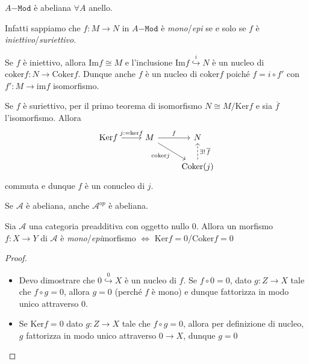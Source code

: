 \begin{example}{}
    \(A\mathtt{-Mod}\) è abeliana \(\forall A\) anello.

    Infatti sappiamo che \(f : M \to N\) in \(A\mathtt{-Mod}\) è \emph{mono}/\emph{epi} se
    e solo se \(f\) è \emph{iniettivo}/\emph{suriettivo}.

    Se \(f\) è iniettivo, allora \(\mathrm{Im}f \cong M\) e l'inclusione \(\mathrm{Im}f \overset{i}{\hookrightarrow } N\) è un nucleo di \(\mathrm{coker}f : N \to \mathrm{Coker}f\). 
    Dunque anche \(f\) è un nucleo di \(\mathrm{coker}f\) poiché \(f = i \circ f'\) con \(f' : M \to \mathrm{im}f\) isomorfismo.

    Se \(f\) è suriettivo, per il primo teorema di isomorfismo \(N \cong M / \mathrm{Ker}f\) e sia 
    \(\overline{f}\) l'isomorfismo. Allora
\[\begin{tikzcd}
	{\mathrm{Ker}f} & M & N \\
	&& {\mathrm{Coker}(j)}
	\arrow["{j:=\mathrm{ker}f}", from=1-1, to=1-2]
	\arrow["f", from=1-2, to=1-3]
	\arrow["{\mathrm{coker}j}"', from=1-2, to=2-3]
	\arrow["{\exists!\,\overline{f}}"', dashed, from=2-3, to=1-3]
\end{tikzcd}\]
    commuta e dunque \(f\) è un conucleo di \(j\).
\end{example}

\begin{remark}{}
    Se \(\mathcal{A}\) è abeliana, anche \(\mathcal{A}^{op}\) è abeliana.
\end{remark}

\begin{proposition}{}
    Sia \(\mathcal{A}\) una categoria preadditiva con oggetto nullo \(0\).
    Allora un morfismo \(f : X \to Y\) di \(\mathcal{A}\) è
    \emph{mono}/\emph{epi}morfismo \(\iff\) \emph{\(\mathrm{Ker}f =
    0\)}/\emph{\(\mathrm{Coker}f = 0\)}
\end{proposition}
\begin{proof}\( \)
\begin{itemize}
    \item[\(\implies \)] Devo dimostrare che \(0 \overset{0}{\hookrightarrow }X \) è un nucleo di \(f\).
        Se \(f \circ 0 = 0\), dato \(g : Z \to X\) tale che \(f \circ g = 0\),
        allora \(g = 0\) (perché \(f\) è mono) e dunque fattorizza in modo unico
        attraverso \(0\).
    \item[\(\impliedby \)] Se \(\mathrm{Ker}f = 0\) dato \(g : Z \to X\) tale
        che \(f \circ g = 0\), allora per definizione di nucleo, \(g\) fattorizza in modo unico attraverso \(0 \to X\), dunque \(g = 0\) 
\end{itemize}
\end{proof}

